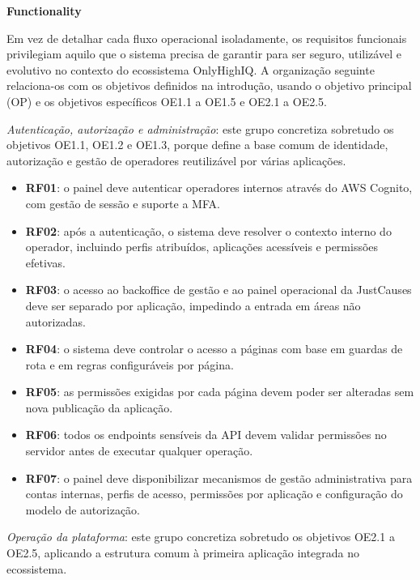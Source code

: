 \noindent\textbf{Functionality}

Em vez de detalhar cada fluxo operacional isoladamente, os requisitos funcionais privilegiam aquilo que o sistema precisa de garantir para ser seguro, utilizável e evolutivo no contexto do ecossistema OnlyHighIQ. A organização seguinte relaciona-os com os objetivos definidos na introdução, usando o objetivo principal (OP) e os objetivos específicos OE1.1 a OE1.5 e OE2.1 a OE2.5.

\medskip\noindent\textit{Autenticação, autorização e administração}: este grupo concretiza sobretudo os objetivos OE1.1, OE1.2 e OE1.3, porque define a base comum de identidade, autorização e gestão de operadores reutilizável por várias aplicações.

\begin{itemize}
  \item \textbf{RF01}: o painel deve autenticar operadores internos através do AWS Cognito, com gestão de sessão e suporte a \gls{MFA}.
  \item \textbf{RF02}: após a autenticação, o sistema deve resolver o contexto interno do operador, incluindo perfis atribuídos, aplicações acessíveis e permissões efetivas.
  \item \textbf{RF03}: o acesso ao backoffice de gestão e ao painel operacional da JustCauses deve ser separado por aplicação, impedindo a entrada em áreas não autorizadas.
  \item \textbf{RF04}: o sistema deve controlar o acesso a páginas com base em guardas de rota e em regras configuráveis por página.
  \item \textbf{RF05}: as permissões exigidas por cada página devem poder ser alteradas sem nova publicação da aplicação.
  \item \textbf{RF06}: todos os endpoints sensíveis da \gls{API} devem validar permissões no servidor antes de executar qualquer operação.
  \item \textbf{RF07}: o painel deve disponibilizar mecanismos de gestão administrativa para contas internas, perfis de acesso, permissões por aplicação e configuração do modelo de autorização.
\end{itemize}

\medskip\noindent\textit{Operação da plataforma}: este grupo concretiza sobretudo os objetivos OE2.1 a OE2.5, aplicando a estrutura comum à primeira aplicação integrada no ecossistema.

